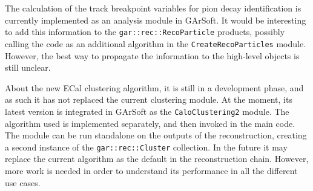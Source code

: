 The calculation of the track breakpoint variables for pion decay identification is currently implemented as an analysis module in GArSoft. It would be interesting to add this information to the \texttt{gar::rec::RecoParticle} products, possibly calling the code as an additional algorithm in the \texttt{CreateRecoParticles} module. However, the best way to propagate the information to the high-level objects is still unclear.

About the new ECal clustering algorithm, it is still in a development phase, and as such it has not replaced the current clustering module. At the moment, its latest version is integrated in GArSoft as the \texttt{CaloClustering2} module. The algorithm used is implemented separately, and then invoked in the main code. The module can be run standalone on the outputs of the reconstruction, creating a second instance of the \texttt{gar::rec::Cluster} collection. In the future it may replace the current algorithm as the default in the reconstruction chain. However, more work is needed in order to understand its performance in all the different use cases.